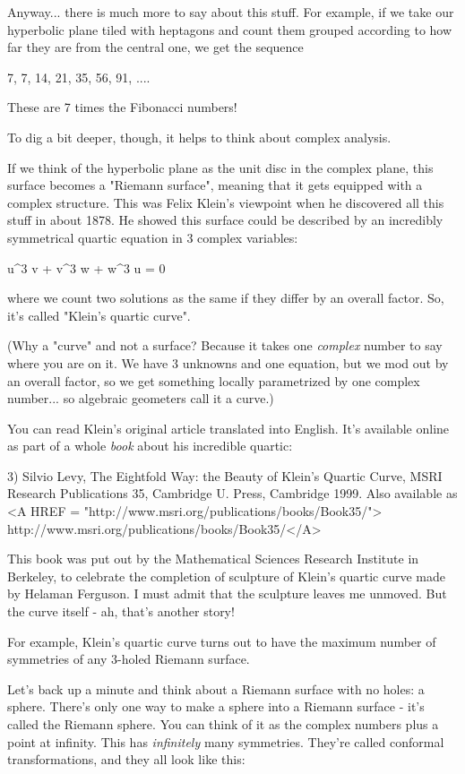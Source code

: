 Anyway... there is much more to say about this stuff.  For example, 
if we take our hyperbolic plane tiled with heptagons and count them 
grouped according to how far they are from the central one, we get 
the sequence

7, 7, 14, 21, 35, 56, 91, ....

These are 7 times the Fibonacci numbers!

To dig a bit deeper, though, it helps to think about complex analysis.

If we think of the hyperbolic plane as the unit disc in the complex 
plane, this surface becomes a "Riemann surface", meaning that it
gets equipped with a complex structure.  This was Felix Klein's
viewpoint when he discovered all this stuff in about 1878.  He 
showed this surface could be described by an incredibly symmetrical 
quartic equation in 3 complex variables:

u^{3} v + v^{3} w + w^{3} u = 0

where we count two solutions as the same if they differ by an overall 
factor.  So, it's called "Klein's quartic curve".  

(Why a "curve" and not a surface?  Because it takes one 
\emph{complex}
number to say where you are on it.  We have 3 unknowns and one 
equation, but we mod out by an overall factor, so we get something
locally parametrized by one complex number... so algebraic geometers
call it a curve.)

You can read Klein's original article translated into English.  
It's available online as part of a whole \emph{book} about his incredible 
quartic: 

3) Silvio Levy, The Eightfold Way: the Beauty of Klein's Quartic Curve,
MSRI Research Publications 35, Cambridge U. Press, Cambridge 1999.
Also available as <A HREF = "http://www.msri.org/publications/books/Book35/">
http://www.msri.org/publications/books/Book35/</A>

This book was put out by the Mathematical Sciences Research Institute 
in Berkeley, to celebrate the completion of sculpture of Klein's
quartic curve made by Helaman Ferguson.  I must admit that the 
sculpture leaves me unmoved.  But the curve itself - ah, that's 
another story!

For example, Klein's quartic curve turns out to have the maximum 
number of symmetries of any 3-holed Riemann surface. 

Let's back up a minute and think about a Riemann surface with no holes:
a sphere.  There's only one way to make a sphere into a Riemann 
surface - it's called the Riemann sphere.  You can think of it as
the complex numbers plus a point at infinity.  This has \emph{infinitely}
many symmetries.  They're called conformal transformations, and they
all look like this:



